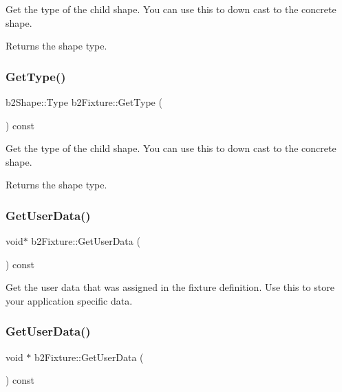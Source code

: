 Get the type of the child shape. You can use this to down cast to the concrete shape. \begin{DoxyReturn}{Returns}
the shape type. 
\end{DoxyReturn}
\mbox{\label{classb2Fixture_a7a566c1e3b768f6a72ebc3b758aad70e}} 
\subsubsection{\texorpdfstring{Get\+Type()}{GetType()}\hspace{0.1cm}{\footnotesize\ttfamily [2/2]}}
{\footnotesize\ttfamily b2\+Shape\+::\+Type b2\+Fixture\+::\+Get\+Type (\begin{DoxyParamCaption}{ }\end{DoxyParamCaption}) const}

Get the type of the child shape. You can use this to down cast to the concrete shape. \begin{DoxyReturn}{Returns}
the shape type. 
\end{DoxyReturn}
\mbox{\label{classb2Fixture_a812561653393617bd951c566802ddc99}} 
\subsubsection{\texorpdfstring{Get\+User\+Data()}{GetUserData()}\hspace{0.1cm}{\footnotesize\ttfamily [1/2]}}
{\footnotesize\ttfamily void$\ast$ b2\+Fixture\+::\+Get\+User\+Data (\begin{DoxyParamCaption}{ }\end{DoxyParamCaption}) const}

Get the user data that was assigned in the fixture definition. Use this to store your application specific data. \mbox{\label{classb2Fixture_ae2a865ed59ffe9b1cb89f577052f4d50}} 
\subsubsection{\texorpdfstring{Get\+User\+Data()}{GetUserData()}\hspace{0.1cm}{\footnotesize\ttfamily [2/2]}}
{\footnotesize\ttfamily void $\ast$ b2\+Fixture\+::\+Get\+User\+Data (\begin{DoxyParamCaption}{ }\end{DoxyParamCaption}) const\hspace{0.3cm}{\ttfamily [inline]}}

